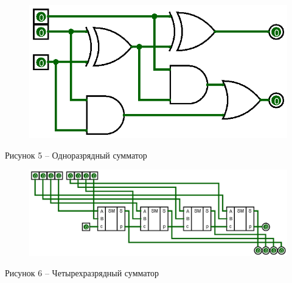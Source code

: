 \documentclass[a4paper,14pt]{extarticle}
\begin{document}
	\begin{figure}[h]
		\centering
		\includegraphics[width=0.5\linewidth]{images/s-2-1}
	\end{figure}
	\begin{center}
		Рисунок 5 – Одноразрядный сумматор
	\end{center}
	
	\begin{figure}[h]
		\centering
		\includegraphics[width=1\linewidth]{images/s-2-2}
	\end{figure}
	\begin{center}
		Рисунок 6 – Четырехразрядный сумматор
	\end{center}
	
	\pagebreak
\end{document}

